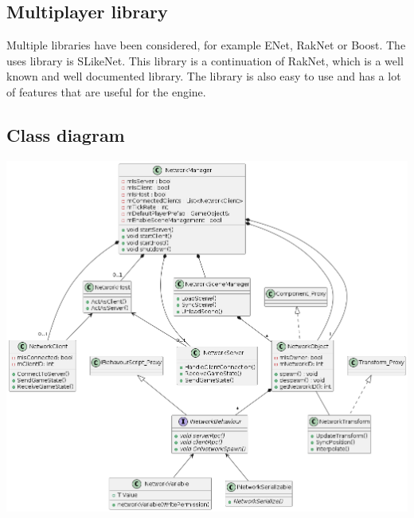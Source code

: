 \documentclass[draft]{article}
\begin{document}
\subsection{Multiplayer library}
Multiple libraries have been considered, for example ENet, RakNet or Boost.
The uses library is SLikeNet. This library is a continuation of RakNet, which is a well known and well documented library.
The library is also easy to use and has a lot of features that are useful for the engine.

\subsection{Class diagram}
\includegraphics[width=\textwidth]{networkingClassDiagram.png}
\end{document}
